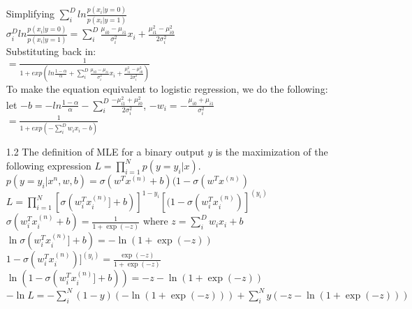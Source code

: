 \documentclass[letterpaper, 12pt]{article}
\begin{document}
\begin{itemize}
		Simplifying $\sum_i^D ln\frac{p(x_i|y = 0)}{p(x_i|y = 1)}$ \\

		$\sigma_i^D ln\frac{p(x_i|y = 0)}{p(x_i|y = 1)} = \sum_i^D\frac{\mu_{i0} - \mu_{i1}}{\sigma_i^2}x_i + \frac{\mu^2_{i1} - \mu^2_{i0}}{2\sigma^2_i}$ \\

		Substituting back in: \\

		$= \frac{1}{1 + exp(ln\frac{1 - \alpha}{\alpha} + \sum_i^D\frac{\mu_{i0} - \mu_{i1}}{\sigma_i^2}x_i + \frac{\mu^2_{i1} - \mu^2_{i0}}{2\sigma^2_i})}$ \\

		To make the equation equivalent to logistic regression, we do the following: \\

		let $-b = -ln\frac{1 - \alpha}{\alpha} - \sum_i^D \frac{-\mu^2_{i1} + \mu^2_{i0}}{2\sigma^2_i}$, $-w_i = -\frac{\mu_{i0} + \mu_{i1}}{\sigma_i^2}$ \\

		$= \frac{1}{1 + exp(-\sum_i^D w_ix_i - b)}$ \\ 



	\item[1.2]
		The definition of MLE for a binary output $y$ is the maximization of the following expression $L = \prod_{i=1}^N p(y = y_i | x)$. \\

		$p( y = y_i | x^n, w, b) = \sigma(w^Tx^{(n)} + b)(1 - \sigma(w^Tx^{(n)})$ \\

		$L = \prod_{i=1}^N [\sigma(w_i^Tx_i^{(n)}] + b)]^{1 - y_i}[(1 - \sigma(w_i^Tx_i^{(n)})]^{(y_i)}$ \\

		$\sigma(w_i^Tx_i^{(n)} + b) = \frac{1}{1 + \exp(-z)}$ where $z = \sum_i^D w_ix_i + b$ \\

		$\ln \sigma(w_i^Tx_i^{(n)}] + b) = -\ln (1 + \exp(-z))$ \\		

		$1 - \sigma(w_i^Tx_i^{(n)})]^{(y_i)} = \frac{\exp(-z)}{1 + \exp(-z)}$\\

		$\ln (1- \sigma(w_i^Tx_i^{(n)}] + b)) = -z - \ln(1 + \exp(-z))$ \\

		$-\ln L = -\sum_i^N (1-y) (-\ln (1 + \exp(-z))) + \sum_i^N y(-z - \ln(1 + \exp(-z)))$ \\


\end{itemize}
\end{document}
